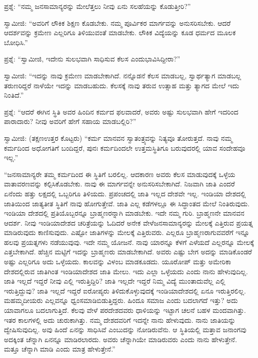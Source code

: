  ಪ್ರಶ್ನೆ: “ನಮ್ಮ ಜನಸಾಮಾನ್ಯರನ್ನು ಮೇಲೆತ್ತಲು ನೀವು ಏನು ಸಲಹೆಯನ್ನು ಕೊಡುತ್ತೀರಿ?” 

 ಸ್ವಾಮೀಜಿ: “ಅವರಿಗೆ ಲೌಕಿಕ ಶಿಕ್ಷಣ ಕೊಡಬೇಕು. ನಮ್ಮ ಪೂರ್ವಿಕರ ಮಾರ್ಗವನ್ನು ಅನುಸರಿಸಬೇಕು. ಆದರೆ ಆದರ್ಶವನ್ನು ಕ್ರಮೇಣ ಎಲ್ಲರಿಗೂ ತಿಳಿಯುವಂತೆ ಮಾಡಬೇಕು. ಲೌಕಿಕ ವಿದ್ಯೆಯನ್ನು ಕೂಡ ಧರ್ಮದ ಮೂಲಕ ಬೋಧಿಸಿ.” 

 ಪ್ರಶ್ನೆ: “ಸ್ವಾಮೀಜಿ, ಇದೇನು ಸುಲಭವಾಗಿ ಸಾಧಿಸುವ ಕೆಲಸ ಎಂದು\break ಭಾವಿಸಿದ್ದೀರಾ?” 

 ಸ್ವಾಮೀಜಿ: “ಇದನ್ನು ನಾವು ಕ್ರಮೇಣ ಮಾಡಬೇಕಾಗಿದೆ. ನನ್ನೊಡನೆ ಕೆಲಸ ಮಾಡಬಲ್ಲ, ಸ್ವಾರ್ಥತ್ಯಾಗ ಮಾಡಬಲ್ಲ ತರುಣರಿದ್ದರೆ ನಾಳೆಯೇ ಇದನ್ನು ಮಾಡಬಹುದು. ಕೆಲಸಕ್ಕೆ ನಾವು ತರುವ ಉತ್ಸಾಹ ಮತ್ತು ತ್ಯಾಗದ ಮೇಲೆ ಇದು ನಿಂತಿದೆ.”‌ 

 ಪ್ರಶ್ನೆ: “ಆದರೆ ಈಗಿನ ಸ್ಥಿತಿ ಅವರ ಹಿಂದಿನ ಕರ್ಮದ ಫಲವಾದರೆ, ಅವರು ಅಷ್ಟು ಸುಲಭವಾಗಿ ಹೇಗೆ ಇದರಿಂದ ಪಾರಾದಾರು? ನೀವು ಅವರಿಗೆ ಹೇಗೆ ಸಹಾಯ ಮಾಡಬಲ್ಲಿರಿ?” 

 ಸ್ವಾಮೀಜಿ: (ತಕ್ಷಣಉತ್ತರ ಕೊಟ್ಟರು) “ಕರ್ಮ ಮಾನವನ ಸ್ವಾತಂತ್ರ್ಯವನ್ನು ನಿತ್ಯವೂ ತೋರುತ್ತದೆ. ನಾವು ನಮ್ಮ ಕರ್ಮದಿಂದ ಅಧೋಗತಿಗೆ ಬಂದಿದ್ದರೆ, ಪುನಃ ಕರ್ಮದಿಂದಲೇ ಉತ್ತಮಸ್ಥಿತಿಗೂ ಬರುವುದರಲ್ಲಿ ಯಾವ ಸಂದೇಹವೂ ಇಲ್ಲ.” 

 “ಜನಸಾಮಾನ್ಯರೇ ತಮ್ಮ ಕರ್ಮದಿಂದ ಈ ಸ್ಥಿತಿಗೆ ಬರಲಿಲ್ಲ. ಆದಕಾರಣ ಅವರು ಕೆಲಸ ಮಾಡುವುದಕ್ಕೆ ಒಳ್ಳೆಯ ವಾತಾವರಣವನ್ನು ಕಲ್ಪಿಸಿಕೊಡಬೇಕು. ನಾವು ಈ ಮಾರ್ಗವನ್ನೇ ಅನುಸರಿಸಬೇಕಾಗಿದೆ. ನಿಜವಾಗಿ ಜಾತಿ ಎಂದರೆ ಏನೆಂದು ಹತ್ತು ಲಕ್ಷದಲ್ಲಿ ಒಬ್ಬರಿಗೂ ತಿಳಿಯದು. ಪ್ರಪಂಚದಲ್ಲಿ ಜಾತಿ ಇಲ್ಲದ ದೇಶವೇ ಇಲ್ಲ. ಇಂಡಿಯಾ ದೇಶದಲ್ಲಿ ಜಾತಿಯಿಂದ ಜಾತ್ಯತೀತ ಸ್ಥಿತಿಗೆ ನಾವು ಹೋಗುತ್ತೇವೆ. ಜಾತಿ ಎಲ್ಲ ಕಡೆಗಳಲ್ಲೂ ಈ ಸಿದ್ಧಾಂತದ ಮೇಲೆ ನಿಂತಿರುವುದು. ಇಂಡಿಯಾ ದೇಶದಲ್ಲಿ ಪ್ರತಿಯೊಬ್ಬರನ್ನೂ ಬ್ರಾಹ್ಮಣರನ್ನಾಗಿ ಮಾಡಬೇಕು. ಇದೇ ನಮ್ಮ ಗುರಿ. ಬ್ರಾಹ್ಮಣನೇ ಮಾನವನ ಆದರ್ಶ. ನೀವು ಇಂಡಿಯಾದೇಶದ ಚರಿತ್ರೆಯನ್ನು ಓದಿದರೆ ಅನೇಕ ವೇಳೆ\break ಜನಸಾಮಾನ್ಯರನ್ನು ಮೇಲಕ್ಕೆ ಎತ್ತಿರುವ ಪ್ರಯತ್ನ ಮಾಡಿರುವುದು ಕಾಣಿಸುವುದು. ಎಷ್ಟೋ ಜಾತಿಗಳನ್ನು ಮೇಲಕ್ಕೆ ಎತ್ತಿರುವರು. ಎಲ್ಲರೂ ಬ್ರಾಹ್ಮಣರಾಗುವವರೆಗೆ ಇನ್ನೂ ಹಲವು ಪ್ರಯತ್ನಗಳು ನಡೆಯುವುವು. ಇದೇ ನಮ್ಮ ಯೋಜನೆ. ನಾವು ಯಾರನ್ನೂ ಕೆಳಗೆ ಎಳೆಯದೆ ಎಲ್ಲರನ್ನೂ ಮೇಲಕ್ಕೆ ಎತ್ತಬೇಕಾಗಿದೆ. ಹೆಚ್ಚಿನ ಮಟ್ಟಿಗೆ ಇದನ್ನು ಬ್ರಾಹ್ಮಣರು ಮಾಡಬೇಕಾಗಿದೆ. ಅವರು ಎಷ್ಟು ಬೇಗ ಅದನ್ನು ಮಾಡಿಕೊಂಡರೆ ಅಷ್ಟು ಎಲ್ಲರಿಗೂ ಅದು ಒಳ್ಳೆಯದು. ಕಾಲವನ್ನು ವಿಳಂಬ ಮಾಡಕೂಡದು. ಯೂರೋಪ್ ಮತ್ತು ಅಮೇರಿಕಾ ದೇಶದಲ್ಲಿರುವ ಜಾತಿಗಿಂತ ಇಂಡಿಯಾದೇಶದ ಜಾತಿ ಮೇಲು. ಇದು ಎಲ್ಲಾ ಒಳ್ಳೆಯದು ಎಂದು ನಾನು ಹೇಳುವುದಿಲ್ಲ. ಜಾತಿ ಇಲ್ಲದೆ ಇದ್ದರೆ ನೀವು ಎಲ್ಲಿ ಇರುತ್ತಿದ್ದಿರಿ? ಜಾತಿ ಇಲ್ಲದೇ ಇದ್ದರೆ ನಿಮ್ಮ ವಿದ್ಯೆ ಮುಂತಾದುವೆಲ್ಲ ಎಲ್ಲಿ ಇರುತ್ತಿದ್ದುವು? ಜಾತಿ ಇಲ್ಲದೆ ಇದ್ದರೆ ಐರೋಪ್ಯರು ತಿಳಿದುಕೊಳ್ಳುವುದಕ್ಕೆ ಇಂಡಿಯಾದೇಶದಲ್ಲಿ ಏನೂ ಇರುತ್ತಿರಲಿಲ್ಲ. ಮಹಮ್ಮದೀಯರು ಎಲ್ಲವನ್ನೂ ಧ್ವಂಸಮಾಡಿಬಿಡುತ್ತಿದ್ದರು. ಹಿಂದೂ ಸಮಾಜ ಎಂದು ಬದಲಾಗದೆ ಇತ್ತು? ಅದು ಯಾವಾಗಲೂ ಬದಲಾಗುತ್ತಿದೆ. ಕೆಲವು ವೇಳೆ ಪರದೇಶದವರು ಧಾಳಿಯನ್ನು ಇಟ್ಟಾಗ ಚಲನೆ ಬಹಳ ಮಂದವಾಗಿತ್ತು. ಇತರ ಕಾಲಗಳಲ್ಲಿ ಅದು ಚುರುಕಾಗಿತ್ತು. ನಮ್ಮ ದೇಶದವರಿಗೆ ಇದನ್ನೇ ನಾನು ಹೇಳುವುದು. ನಾನು ಜಾತಿಯನ್ನು ದ್ವೇಷಿಸುವುದಿಲ್ಲ. ಅವು ಹಿಂದೆ ಏನನ್ನು ಸಾಧಿಸಿವೆ ಎಂಬುದನ್ನು ನೋಡಿರುವೆನು. ಆ ಸ್ಥಿತಿಯಲ್ಲಿ ಮತ್ತಾವ ಜನಾಂಗವು ಅದಕ್ಕಿಂತ ಚೆನ್ನಾಗಿ ಏನನ್ನೂ ಮಾಡಿರಲಾರದು. ಅವರು ಚೆನ್ನಾಗಿಯೇ ಮಾಡಿರುವರು ಎಂದು ನಾನು ಹೇಳುತ್ತೇನೆ. ಮತ್ತೂ ಚೆನ್ನಾಗಿ ಮಾಡಿ ಎಂದು ಮಾತ್ರ ಹೇಳುತ್ತೇನೆ.” 

